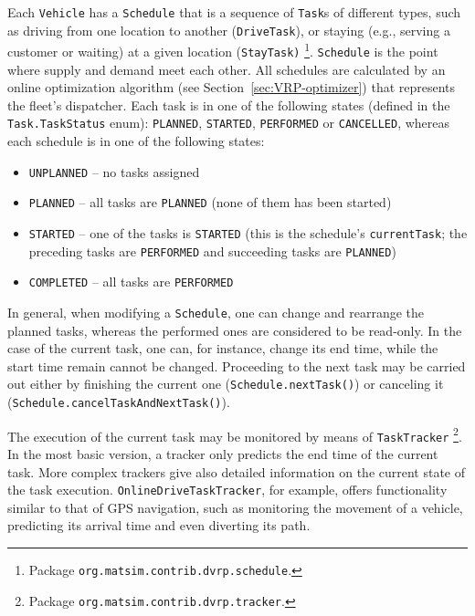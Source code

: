Each \lstinline$Vehicle$ has a \lstinline$Schedule$ that is a sequence of \lstinline$Task$s of different types, such as driving from one location to another (\lstinline$DriveTask$), or staying (e.g., serving a customer or waiting) at a given location (\lstinline$StayTask)$%
\footnote{
Package \lstinline$org.matsim.contrib.dvrp.schedule$.
}. \lstinline$Schedule$ is the point where supply and demand meet each other. All schedules are calculated by an online optimization algorithm (see Section~\ref{sec:VRP-optimizer}) that represents the fleet's dispatcher. Each task is in one of the following states (defined in the \lstinline$Task.TaskStatus$ enum): \lstinline$PLANNED$, \lstinline$STARTED$, \lstinline$PERFORMED$ or \lstinline$CANCELLED$, whereas each schedule is in one of the following states:
%
\begin{itemize}
	\item \lstinline$UNPLANNED$ -- no tasks assigned
	
	\item \lstinline$PLANNED$ -- all tasks are \lstinline$PLANNED$ (none of them has been started)
	
	\item \lstinline$STARTED$ -- one of the tasks is \lstinline$STARTED$ (this is the schedule's \lstinline$currentTask$; the preceding tasks are \lstinline$PERFORMED$ and succeeding tasks are \lstinline$PLANNED$)
	
	\item \lstinline$COMPLETED$ -- all tasks are \lstinline$PERFORMED$
\end{itemize}
%
In general, when modifying a \lstinline$Schedule$, one can change and rearrange the planned tasks, whereas the performed ones are considered to be read-only. In the case of the current task, one can, for instance, change its end time, while the start time remain cannot be changed. Proceeding to the next task may be carried out either by finishing the current one (\lstinline$Schedule.nextTask()$) or canceling it (\lstinline$Schedule.cancelTaskAndNextTask()$).

The execution of the current task may be monitored by means of \lstinline$TaskTracker$%
\footnote{
Package \lstinline$org.matsim.contrib.dvrp.tracker$.
}.
In the most basic version, a tracker only predicts the end time of the current task. More complex trackers give also detailed information on the current state of the task execution. \lstinline$OnlineDriveTaskTracker$, for example, offers functionality similar to that of GPS navigation, such as monitoring the movement of a vehicle, predicting its arrival time and even diverting its path.

